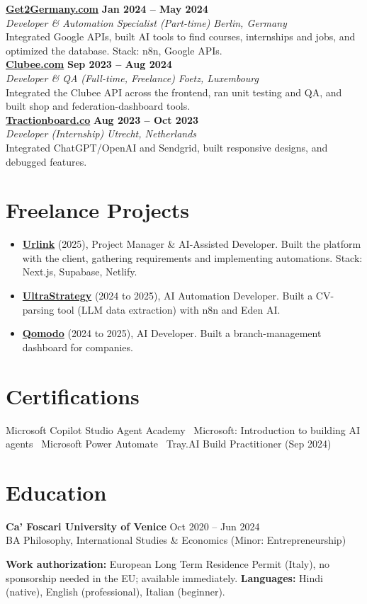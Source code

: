 \documentclass[a4paper,10pt]{article}
\newcommand{\role}[4]{%
 \textbf{#1} \hfill \textbf{#2}\\[1pt]%
 \textit{#3} \hfill \textit{#4}\\[2pt]%
}
\begin{document}
\role{\href{https://get2germany.com}{Get2Germany.com}}{Jan 2024 -- May 2024}{Developer \& Automation Specialist (Part-time)}{Berlin, Germany}
Integrated Google APIs, built AI tools to find courses, internships and jobs, and optimized the database. Stack: n8n, Google APIs.\\[1pt]

\role{\href{https://clubee.com}{Clubee.com}}{Sep 2023 -- Aug 2024}{Developer \& QA (Full-time, Freelance)}{Foetz, Luxembourg}
Integrated the Clubee API across the frontend, ran unit testing and QA, and built shop and federation-dashboard tools.\\[1pt]

\role{\href{https://tractionboard.co}{Tractionboard.co}}{Aug 2023 -- Oct 2023}{Developer (Internship)}{Utrecht, Netherlands}
Integrated ChatGPT/OpenAI and Sendgrid, built responsive designs, and debugged features.

\section{Freelance Projects}
\begin{itemize}
 \item \textbf{\href{https://smarturlink.com/}{Urlink}} (2025), Project Manager \& AI-Assisted Developer. Built the platform with the client, gathering requirements and implementing automations. Stack: Next.js, Supabase, Netlify.
 \item \textbf{\href{https://ultrastrategy.com}{UltraStrategy}} (2024 to 2025), AI Automation Developer. Built a CV-parsing tool (LLM data extraction) with n8n and Eden AI.
 \item \textbf{\href{https://www.qomodo.me/}{Qomodo}} (2024 to 2025), AI Developer. Built a branch-management dashboard for companies.
\end{itemize}

\section{Certifications}
Microsoft Copilot Studio Agent Academy \textbullet\ Microsoft: Introduction to building AI agents \textbullet\ Microsoft Power Automate \textbullet\ Tray.AI Build Practitioner (Sep 2024)

\section{Education}
\textbf{Ca' Foscari University of Venice} \hfill Oct 2020 -- Jun 2024\\
BA Philosophy, International Studies \& Economics (Minor: Entrepreneurship)

\vspace{2pt}
{\small \textbf{Work authorization:} European Long Term Residence Permit (Italy), no sponsorship needed in the EU; available immediately. \quad \textbf{Languages:} Hindi (native), English (professional), Italian (beginner).}
\end{document}
